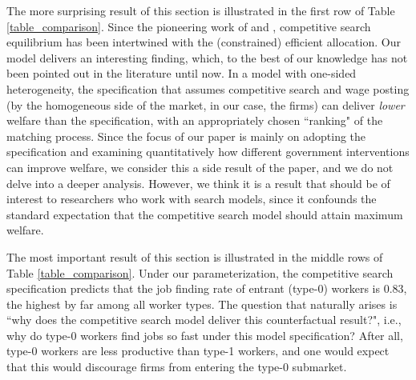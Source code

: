 \documentclass[12pt]{article} %
\theoremstyle{definition}
\begin{document}
The more surprising result of this section is illustrated in the first row of Table \ref{table_comparison}. Since the pioneering work of \cite{moen1997competitive} and \cite{shimer1996essays}, competitive search equilibrium has been intertwined with the (constrained) efficient allocation. Our model delivers an interesting finding, which, to the best of our knowledge has not been pointed out in the literature until now. In a model with one-sided heterogeneity, the specification that assumes competitive search and wage posting (by the homogeneous side of the market, in our case, the firms) can deliver \textit{lower} welfare than the \cite{petrongolo2001looking} specification, with an appropriately chosen ``ranking" of the matching process. Since the focus of our paper is mainly on adopting the \cite{petrongolo2001looking} specification 
and examining quantitatively how different government interventions can improve welfare, we consider this a side result of the paper, and we do not delve into a deeper analysis. However, we think it is a result that should be of interest to researchers who work with search models, since it confounds the standard expectation that the competitive search model should attain maximum welfare.      



The most important result of this section is illustrated in the middle rows of Table \ref{table_comparison}. Under our parameterization, the competitive search specification predicts that the job finding rate of entrant (type-0) workers is 0.83, the highest by far among all worker types. The question that naturally arises is ``why does the competitive search model deliver this counterfactual result?", i.e., why do type-0 workers find jobs so fast under this model specification? After all, type-0 workers are less productive than type-1 workers, and one would expect that this would   
discourage firms from entering the type-0 submarket. 
\end{document}
